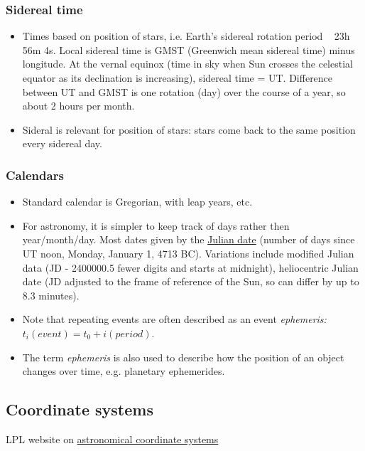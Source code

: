 \documentclass[12pt]{article}
\begin{document}
    \subsubsection*{Sidereal time}
        \begin{itemize}
            \item Times based on position of stars, i.e. Earth's sidereal
                rotation period ~ 23h 56m 4s. Local sidereal time is GMST
                (Greenwich mean sidereal time) minus longitude. At the vernal
                equinox (time in sky when Sun crosses the celestial equator
                as its declination is increasing), sidereal time = UT.
                Difference between UT and GMST is one rotation (day) over
                the course of a year, so about 2 hours per month.
            \item Sideral is relevant for position of stars: stars come back
                to the same position every sidereal day.
        \end{itemize}
    \subsubsection*{Calendars}
        \begin{itemize}
            \item Standard calendar is Gregorian, with leap years, etc.
            \item For astronomy, it is simpler to keep track of days rather
                then year/month/day. Most dates given by the
                \url{Julian date} (number of days since UT noon, Monday,
                January 1, 4713 BC). Variations include modified Julian
                data (JD - 2400000.5 fewer digits and starts at midnight),
                heliocentric Julian date (JD adjusted to the frame of
                reference of the Sun, so can differ by up to 8.3 minutes).
            \item Note that repeating events are often described as an event
                \textit{ephemeris:} $t_i(event) = t_0 + i(period)$.
            \item The term \textit{ephemeris} is also used to describe how the
                position of an object changes over time, e.g. planetary
                ephemerides.
        \end{itemize}

\subsection*{Coordinate systems}
LPL website on \textcolor{blue}
{\href{http://spider.seds.org/spider/ScholarX/coords.html}
{astronomical coordinate systems}}
\end{document}
